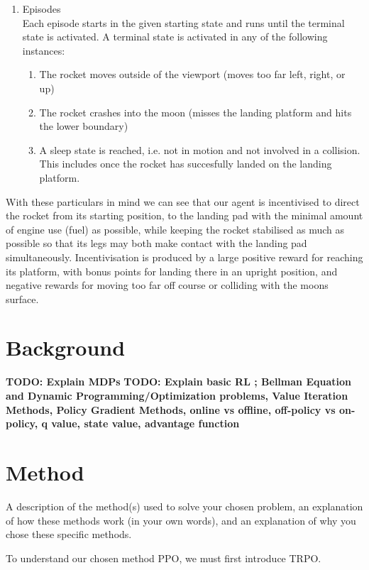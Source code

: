 \documentclass{article}
\begin{document}
\begin{enumerate}
  \item Episodes\\
  Each episode starts in the given starting state and runs until the terminal state is activated. A terminal state is activated in any of the following instances:
  \begin{enumerate}
    \item The rocket moves outside of the viewport (moves too far left, right, or up)
    \item The rocket crashes into the moon (misses the landing platform and hits the lower boundary)
    \item A sleep state is reached, i.e. not in motion and not involved in a collision. This includes once the rocket has succesfully landed on the landing platform.
  \end{enumerate}
\end{enumerate}

With these particulars in mind we can see that our agent is incentivised to direct the rocket from its starting position, to the landing pad with the minimal amount of engine use (fuel) as possible, while keeping the rocket stabilised as much as possible so that its legs may both make contact with the landing pad simultaneously. Incentivisation is produced by a large positive reward for reaching its platform, with bonus points for landing there in an upright position, and negative rewards for moving too far off course or colliding with the moons surface.


\section{Background}
\textbf{TODO: Explain MDPs}
\textbf{TODO: Explain basic RL ; Bellman Equation and Dynamic Programming/Optimization problems, Value Iteration Methods, Policy Gradient Methods, online vs offline, off-policy vs on-policy, q value, state value, advantage function}

\section{Method}
A description of the method(s) used to solve your chosen problem, an explanation
of how these methods work (in your own words), and an explanation of why you chose these
specific methods.\\\newline

To understand our chosen method PPO, we must first introduce TRPO. 
\end{document}
